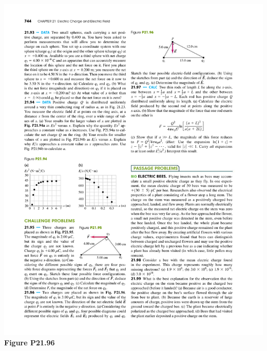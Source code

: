 \documentclass[11pt]{article}
\begin{document}
\begin{minipage}[r]{0.3\textwidth}
\includegraphics[width=\textwidth]{P21-96}
\center \textbf{Figure P21.96}
\end{minipage}
\end{document}
